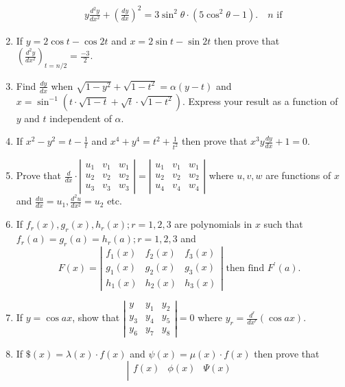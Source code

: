 \begin{enumerate}
\[\begin{aligned}
    & y \frac{d^2 y}{d x^2}+\left(\frac{d y}{d x}\right)^2=3 \sin ^2 \theta \cdot\left(5 \cos ^2 \theta-1\right) . \quad n \text { if }
    \end{aligned}
    \]
    \item If $y=2 \cos t-\cos 2 t$ and $x=2 \sin t-\sin 2 t$ then prove that $\left(\frac{d^2 y}{d x^2}\right)_{t=n / 2}=\frac{-3}{2}$.
    \item Find $\frac{d y}{d x}$ when $\sqrt{1-y^2}+\sqrt{1-t^2}=\alpha(y-t)$ and $x=\sin ^{-1}\left(t \cdot \sqrt{1-t}+\sqrt{t} \cdot \sqrt{1-t^2}\right)$. Express your result as a function of $y$ and $t$ independent of $\alpha$.
    \item If $x^2-y^2=t-\frac{1}{t}$ and $x^4+y^4=t^2+\frac{1}{t^2}$ then prove that $x^3 y \frac{d y}{d x}+1=0$.
    \item Prove that $\frac{d}{d x} \cdot\left|\begin{array}{lll}u_1 & v_1 & w_1 \\ u_2 & v_2 & w_2 \\ u_3 & v_3 & w_3\end{array}\right|=\left|\begin{array}{lll}u_1 & v_1 & w_1 \\ u_2 & v_2 & w_2 \\ u_4 & v_4 & w_4\end{array}\right|$ where $u, v, w$ are functions of $x$ and $\frac{d u}{d x}=u_1, \frac{d^2 u}{d x^2}=u_2$ etc.
    \item If $f_r(x), g_r(x), h_r(x) ; r=1,2,3$ are polynomials in $x$ such that $f_r(a)=g_r(a)=h_r(a) ; r=1,2,3$ and
    \[
    F(x)=\left|\begin{array}{lll}
    f_1(x) & f_2(x) & f_3(x) \\
    g_1(x) & g_2(x) & g_3(x) \\
    h_1(x) & h_2(x) & h_3(x)
    \end{array}\right| \text { then find } F^{\prime}(a) \text {. }
    \]
    \item If $y=\cos a x$, show that $\left|\begin{array}{lll}y & y_1 & y_2 \\ y_3 & y_4 & y_5 \\ y_6 & y_7 & y_8\end{array}\right|=0$ where $y_r=\frac{d^r}{d x^r}(\cos a x)$.
    \item If $\$(x)=\lambda(x) \cdot f(x)$ and $\psi(x)=\mu(x) \cdot f(x)$ then prove that
    \[
    \left|\begin{array}{ccc}
    f(x) & \phi(x) & \Psi(x) \\

\end{array}\]
\end{enumerate}
